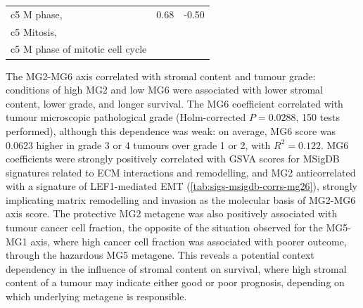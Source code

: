 \documentclass[dissertation.tex]{subfiles}
\begin{document}
\begin{table}[ht]
\begin{tabularx}{\textwidth}{ @{} X l l @{} }
  c5 M phase, & 0.68 & -0.50 \\ 
  c5 Mitosis, & & \\
  c5 M phase of mitotic cell cycle & & \\
   \bottomrule
\end{tabularx}
\end{table}

The MG2-MG6 axis correlated with stromal content and tumour grade: conditions of high MG2 and low MG6 were associated with lower stromal content, lower grade, and longer survival.  The MG6 coefficient correlated with tumour microscopic pathological grade (Holm-corrected $P = 0.0288$, 150 tests performed), although this dependence was weak: on average, MG6 score was 0.0623 higher in grade 3 or 4 tumours over grade 1 or 2, with $R^2 = 0.122$.  MG6 coefficients were strongly positively correlated with \gls{GSVA} scores for \gls{MSigDB} signatures related to \gls{ECM} interactions and remodelling, and MG2 anticorrelated with a signature of LEF1-mediated \gls{EMT} (\cref{tab:sigs-msigdb-corrs-mg26}), strongly implicating matrix remodelling and invasion as the molecular basis of MG2-MG6 axis score.  The protective MG2 metagene was also positively associated with tumour cancer cell fraction, the opposite of the situation observed for the MG5-MG1 axis, where high cancer cell fraction was associated with poorer outcome, through the hazardous MG5 metagene.  This reveals a potential context dependency in the influence of stromal content on survival, where high stromal content of a tumour may indicate either good or poor prognosis, depending on which underlying metagene is responsible.
\end{document}
